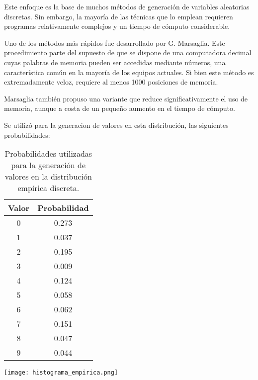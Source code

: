 \documentclass[11pt]{article}
\begin{document}
Este enfoque es la base de muchos métodos de generación de variables aleatorias discretas. Sin embargo, la mayoría de las técnicas que lo emplean requieren programas relativamente complejos y un tiempo de cómputo considerable.

Uno de los métodos más rápidos fue desarrollado por G. Marsaglia. Este procedimiento parte del supuesto de que se dispone de una computadora decimal cuyas palabras de memoria pueden ser accedidas mediante números, una característica común en la mayoría de los equipos actuales. Si bien este método es extremadamente veloz, requiere al menos 1000 posiciones de memoria.

Marsaglia también propuso una variante que reduce significativamente el uso de memoria, aunque a costa de un pequeño aumento en el tiempo de cómputo.

Se utilizó para la generacion de valores en esta distribución, las siguientes probabilidades:

\begin{table}[H]
\centering
\begin{tabular}{|c|c|}
\hline
\textbf{Valor} & \textbf{Probabilidad} \\
\hline
0 & 0.273 \\
1 & 0.037 \\
2 & 0.195 \\
3 & 0.009 \\
4 & 0.124 \\
5 & 0.058 \\
6 & 0.062 \\
7 & 0.151 \\
8 & 0.047 \\
9 & 0.044 \\
\hline
\end{tabular}
\caption{Probabilidades utilizadas para la generación de valores en la distribución empírica discreta.}
\label{tab:empirica}
\end{table}


\begin{center}
\texttt{[image: histograma\_empirica.png]}

\end{center}
\end{document}
